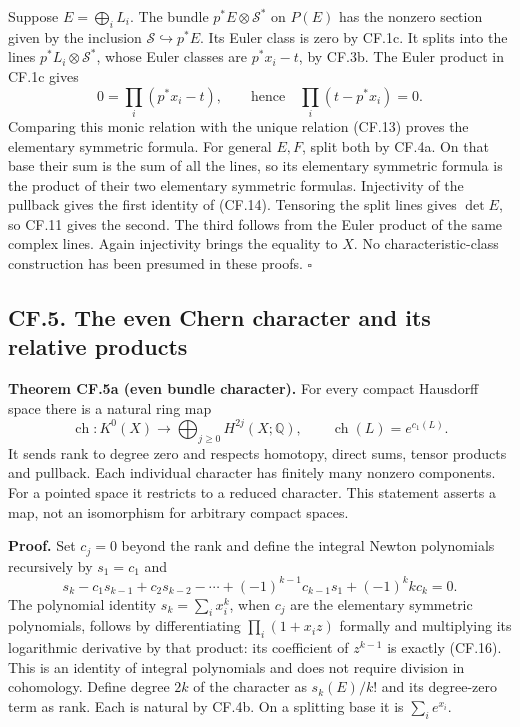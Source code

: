 \documentclass[
  11pt,
]{article}
\begin{document}
Suppose \(E=\bigoplus_iL_i\). The bundle \(p^*E\otimes\mathcal S^*\) on
\(P(E)\) has the nonzero section given by the inclusion
\(\mathcal S\hookrightarrow p^*E\). Its Euler class is zero by CF.1c. It
splits into the lines \(p^*L_i\otimes\mathcal S^*\), whose Euler classes
are \(p^*x_i-t\), by CF.3b. The Euler product in CF.1c gives \[
0=\prod_i(p^*x_i-t),\qquad \text{hence}\quad \prod_i(t-p^*x_i)=0.
\] Comparing this monic relation with the unique relation (CF.13) proves
the elementary symmetric formula. For general \(E,F\), split both by
CF.4a. On that base their sum is the sum of all the lines, so its
elementary symmetric formula is the product of their two elementary
symmetric formulas. Injectivity of the pullback gives the first identity
of (CF.14). Tensoring the split lines gives \(\det E\), so CF.11 gives
the second. The third follows from the Euler product of the same complex
lines. Again injectivity brings the equality to \(X\). No
characteristic-class construction has been presumed in these proofs.
\(\square\)

\subsection{CF.5. The even Chern character and its relative
products}\label{cf.5.-the-even-chern-character-and-its-relative-products}

\textbf{Theorem CF.5a (even bundle character).} For every compact
Hausdorff space there is a natural ring map \[
\operatorname{ch}:K^0(X)\longrightarrow\bigoplus_{j\geq0}H^{2j}(X;\mathbb Q),
\qquad \operatorname{ch}(L)=e^{c_1(L)}.
\tag{CF.15}
\] It sends rank to degree zero and respects homotopy, direct sums,
tensor products and pullback. Each individual character has finitely
many nonzero components. For a pointed space it restricts to a reduced
character. This statement asserts a map, not an isomorphism for
arbitrary compact spaces.

\textbf{Proof.} Set \(c_j=0\) beyond the rank and define the integral
Newton polynomials recursively by \(s_1=c_1\) and \[
s_k-c_1s_{k-1}+c_2s_{k-2}-\cdots
 +(-1)^{k-1}c_{k-1}s_1+(-1)^k k c_k=0.
\tag{CF.16}
\] The polynomial identity \(s_k=\sum_i x_i^k\), when \(c_j\) are the
elementary symmetric polynomials, follows by differentiating
\(\prod_i(1+x_i z)\) formally and multiplying its logarithmic derivative
by that product: its coefficient of \(z^{k-1}\) is exactly (CF.16). This
is an identity of integral polynomials and does not require division in
cohomology. Define degree \(2k\) of the character as \(s_k(E)/k!\) and
its degree-zero term as rank. Each is natural by CF.4b. On a splitting
base it is \(\sum_i e^{x_i}\).
\end{document}

